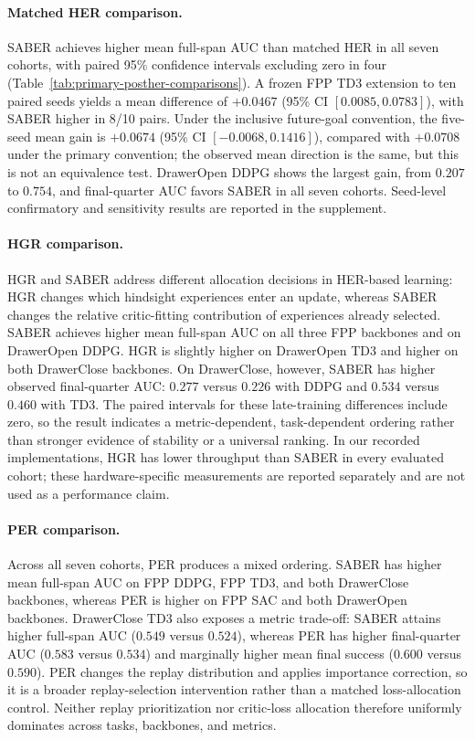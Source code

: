 \documentclass[letterpaper]{article}
\begin{document}
\paragraph{Matched HER comparison.}
SABER achieves higher mean full-span AUC than matched HER in all seven cohorts, with paired 95\% confidence intervals excluding zero in four (Table~\ref{tab:primary-posther-comparisons}). A frozen FPP TD3 extension to ten paired seeds yields a mean difference of \(+0.0467\) (95\% CI \([0.0085,0.0783]\)), with SABER higher in 8/10 pairs. Under the inclusive future-goal convention, the five-seed mean gain is \(+0.0674\) (95\% CI \([-0.0068,0.1416]\)), compared with \(+0.0708\) under the primary convention; the observed mean direction is the same, but this is not an equivalence test. DrawerOpen DDPG shows the largest gain, from \(0.207\) to \(0.754\), and final-quarter AUC favors SABER in all seven cohorts. Seed-level confirmatory and sensitivity results are reported in the supplement.

\paragraph{HGR comparison.}
HGR and SABER address different allocation decisions in HER-based learning: HGR changes which hindsight experiences enter an update, whereas SABER changes the relative critic-fitting contribution of experiences already selected. SABER achieves higher mean full-span AUC on all three FPP backbones and on DrawerOpen DDPG. HGR is slightly higher on DrawerOpen TD3 and higher on both DrawerClose backbones. On DrawerClose, however, SABER has higher observed final-quarter AUC: \(0.277\) versus \(0.226\) with DDPG and \(0.534\) versus \(0.460\) with TD3. The paired intervals for these late-training differences include zero, so the result indicates a metric-dependent, task-dependent ordering rather than stronger evidence of stability or a universal ranking. In our recorded implementations, HGR has lower throughput than SABER in every evaluated cohort; these hardware-specific measurements are reported separately and are not used as a performance claim.

\paragraph{PER comparison.}
Across all seven cohorts, PER produces a mixed ordering. SABER has higher mean full-span AUC on FPP DDPG, FPP TD3, and both DrawerClose backbones, whereas PER is higher on FPP SAC and both DrawerOpen backbones. DrawerClose TD3 also exposes a metric trade-off: SABER attains higher full-span AUC (\(0.549\) versus \(0.524\)), whereas PER has higher final-quarter AUC (\(0.583\) versus \(0.534\)) and marginally higher mean final success (\(0.600\) versus \(0.590\)). PER changes the replay distribution and applies importance correction, so it is a broader replay-selection intervention rather than a matched loss-allocation control. Neither replay prioritization nor critic-loss allocation therefore uniformly dominates across tasks, backbones, and metrics.
\end{document}
